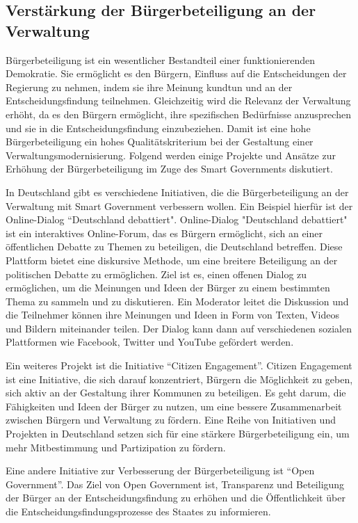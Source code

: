 \subsection{Verstärkung der Bürgerbeteiligung an der Verwaltung}
Bürgerbeteiligung ist ein wesentlicher Bestandteil einer funktionierenden Demokratie. 
Sie ermöglicht es den Bürgern, Einfluss auf die Entscheidungen der Regierung zu nehmen, indem sie ihre Meinung kundtun und an der Entscheidungsfindung teilnehmen.
Gleichzeitig wird die Relevanz der Verwaltung erhöht, da es den Bürgern ermöglicht, ihre spezifischen Bedürfnisse anzusprechen und sie in die Entscheidungsfindung einzubeziehen.
Damit ist eine hohe Bürgerbeteiligung ein hohes Qualitätskriterium bei der Gestaltung einer Verwaltungsmodernisierung.
Folgend werden einige Projekte und Ansätze zur Erhöhung der Bürgerbeteiligung im Zuge des Smart Governments diskutiert.
\par
In Deutschland gibt es verschiedene Initiativen, die die Bürgerbeteiligung an der Verwaltung mit Smart Government verbessern wollen. 
Ein Beispiel hierfür ist der Online-Dialog ``Deutschland debattiert". 
Online-Dialog "Deutschland debattiert" ist ein interaktives Online-Forum, das es Bürgern ermöglicht, sich an einer öffentlichen Debatte zu Themen zu beteiligen, die Deutschland betreffen. 
Diese Plattform bietet eine diskursive Methode, um eine breitere Beteiligung an der politischen Debatte zu ermöglichen. 
Ziel ist es, einen offenen Dialog zu ermöglichen, um die Meinungen und Ideen der Bürger zu einem bestimmten Thema zu sammeln und zu diskutieren. 
Ein Moderator leitet die Diskussion und die Teilnehmer können ihre Meinungen und Ideen in Form von Texten, Videos und Bildern miteinander teilen. 
Der Dialog kann dann auf verschiedenen sozialen Plattformen wie Facebook, Twitter und YouTube gefördert werden.
\par
Ein weiteres Projekt ist die Initiative ``Citizen Engagement''.
Citizen Engagement ist eine Initiative, die sich darauf konzentriert, Bürgern die Möglichkeit zu geben, sich aktiv an der Gestaltung ihrer Kommunen zu beteiligen. 
Es geht darum, die Fähigkeiten und Ideen der Bürger zu nutzen, um eine bessere Zusammenarbeit zwischen Bürgern und Verwaltung zu fördern.  
Eine Reihe von Initiativen und Projekten in Deutschland setzen sich für eine stärkere Bürgerbeteiligung ein, um mehr Mitbestimmung und Partizipation zu fördern.
\par
Eine andere Initiative zur Verbesserung der Bürgerbeteiligung ist ``Open Government''.
Das Ziel von Open Government ist, Transparenz und Beteiligung der Bürger an der Entscheidungsfindung zu erhöhen und die Öffentlichkeit über die Entscheidungsfindungsprozesse des Staates zu informieren.

